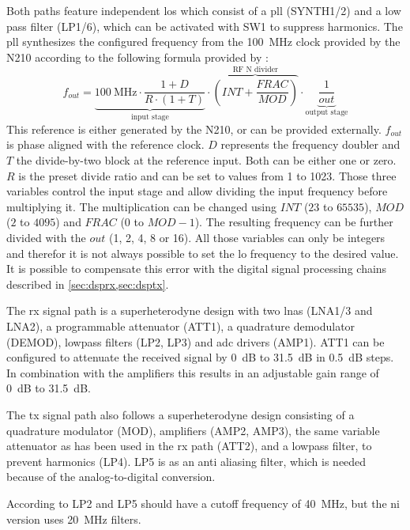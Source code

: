 \documentclass[12pt,a4paper,parskip=full]{scrartcl}
\begin{document}
Both paths feature independent \glspl{lo} which consist of a \gls{pll} (SYNTH1/2) and a low
pass filter (LP1/6), which can be activated with SW1 to suppress harmonics\cite{flo}. The
\gls{pll} synthesizes the configured frequency from the \SI{100}{\mega\hertz} clock provided
by the N210 according to the following formula provided by \cite{synth}:
\begin{equation}
\label{eq:frequency}
f_{out} = \underbrace{\SI{100}{\mega\hertz} \cdot \frac{1 + D}{R \cdot (1 + T)}}_\text{input stage} \cdot \overbrace{\left(INT + \frac{FRAC}{MOD}\right)}^\text{RF N divider} \cdot \underbrace{\frac{1}{out}}_\text{output stage}
\end{equation}
This reference is either generated by the N210, or can be provided externally.
$f_{out}$ is phase aligned with the reference clock. $D$ represents the frequency doubler
and $T$ the divide-by-two block at the reference input. Both can
be either one or zero. $R$ is the preset divide ratio and can be set to values from 1 to 1023.
Those three variables control the input stage and allow dividing the input frequency before multiplying
it. The multiplication can be changed using $INT$ ($23$ to $65535$), $MOD$ ($2$ to $4095$)
and $FRAC$ (0 to $MOD - 1$). The resulting frequency can be further divided with the $out$ (1, 2, 4, 8 or 16).
All those variables can only be integers and therefor it is not always possible to set the \gls{lo}
frequency to the desired value. It is possible to compensate this error with the digital signal
processing chains described in \cref{sec:dsprx,sec:dsptx}.

The \gls{rx} signal path is a superheterodyne design with two \glspl{lna} (LNA1/3 and LNA2),
a programmable attenuator (ATT1), a quadrature demodulator (DEMOD), lowpass filters (LP2, LP3)
and \gls{adc} drivers (AMP1). ATT1 can be configured to attenuate the received signal by
\SI{0}{\deci\bel} to \SI{31.5}{\deci\bel} in \SI{0.5}{\deci\bel} steps. In combination with
the amplifiers this results in an adjustable gain range of \SI{0}{\deci\bel} to \SI{31.5}{\deci\bel}.

The \gls{tx} signal path also follows a superheterodyne design consisting of a quadrature
modulator (MOD), amplifiers (AMP2, AMP3), the same variable attenuator as has been used in
the \gls{rx} path (ATT2), and a lowpass filter, to prevent harmonics (LP4). LP5 is as an
anti aliasing filter, which is needed because of the analog-to-digital conversion.

According to \cite{sch_sbx} LP2 and LP5 should have a cutoff frequency of \SI{40}{\mega\hertz},
but the \gls{ni} version uses \SI{20}{\mega\hertz} filters\cite{ni_29xx}.
\end{document}

